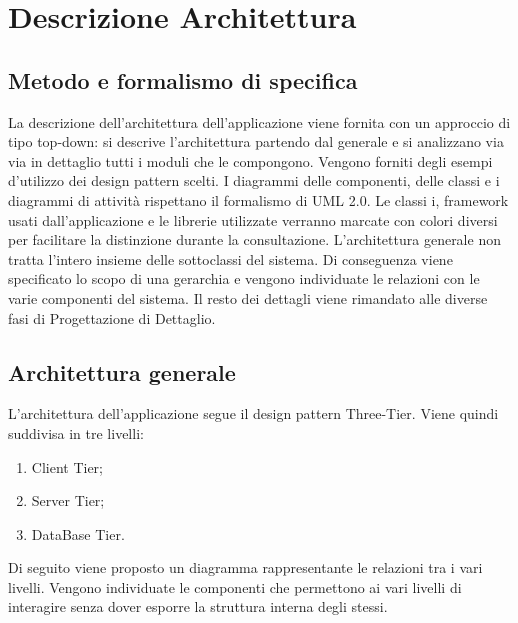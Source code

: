 %


\section{Descrizione Architettura} %
\label{sec:descrizione_architettura}

\subsection{Metodo e formalismo di specifica}
La descrizione dell'architettura dell'applicazione viene fornita con un approccio di tipo top-down: si descrive l'architettura partendo dal generale e si analizzano via via in dettaglio tutti i moduli che le compongono. Vengono forniti degli esempi d'utilizzo dei design pattern scelti. I diagrammi delle componenti, delle classi e i diagrammi di attività rispettano il formalismo di UML 2.0. \newline
Le classi i, framework usati dall'applicazione e le librerie utilizzate verranno marcate con colori diversi per facilitare la distinzione durante la consultazione. \newline
L’architettura generale non tratta l’intero insieme delle sottoclassi del sistema. Di conseguenza viene specificato lo scopo di una gerarchia e vengono individuate le relazioni con le varie componenti del sistema. Il resto dei dettagli viene rimandato alle diverse fasi di Progettazione di Dettaglio.


	\subsection{Architettura generale}
	L’architettura dell'applicazione segue il design pattern Three-Tier. Viene quindi suddivisa in tre livelli:
		\begin{enumerate}
			\item Client Tier;
			\item Server Tier;
			\item DataBase Tier.
		\end{enumerate}
		\noindent
		Di seguito viene proposto un diagramma rappresentante le relazioni tra i vari livelli. Vengono individuate le componenti che permettono ai vari livelli di interagire senza dover esporre la struttura interna degli stessi. \newline \newline

